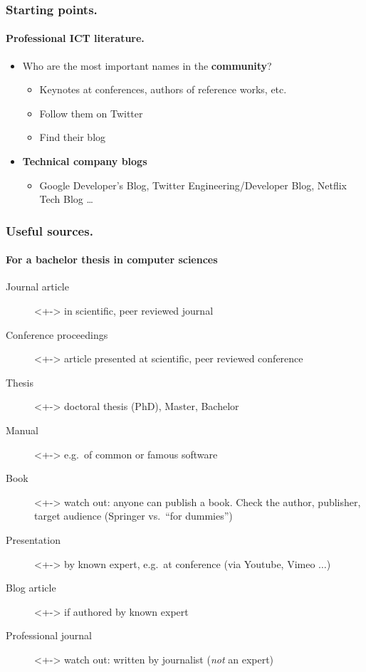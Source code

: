 \documentclass[aspectratio=169]{beamer}
\begin{document}
\begin{frame}
    \frametitle{Starting points.}
    \framesubtitle{Professional ICT literature.}

    \begin{itemize}
        \item<+-> Who are the most important names in the \textbf{community}?
            \begin{itemize}
                \item Keynotes at conferences, authors of reference works, etc.
                \item Follow them on Twitter
                \item Find their blog
            \end{itemize}
        \item<+-> \textbf{Technical company blogs}
            \begin{itemize}
                \item Google Developer's Blog, Twitter Engineering/Developer Blog, Netflix Tech Blog \dots
            \end{itemize}
    \end{itemize}
\end{frame}


\begin{frame}
    \frametitle{Useful sources.}
    \framesubtitle{For a bachelor thesis in computer sciences}

    \begin{description}
        \item[Journal article]<+-> in scientific, peer reviewed journal
        \item[Conference proceedings]<+-> article presented at scientific, peer reviewed conference
        \item[Thesis]<+-> doctoral thesis (PhD), Master, Bachelor
        \item[Manual]<+-> e.g.\ of common or famous software
        \item[Book]<+-> watch out: anyone can publish a book. Check the author, publisher, target audience (Springer vs.\ ``for dummies'')
        \item[Presentation]<+-> by known expert, e.g.\ at conference (via Youtube, Vimeo $\ldots$)
        \item[Blog article]<+-> if authored by known expert
        \item[Professional journal]<+-> watch out: written by journalist (\textit{not} an expert)
    \end{description}
\end{frame}
\end{document}
